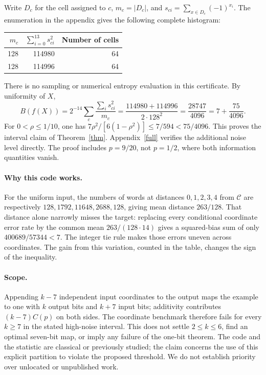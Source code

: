 \documentclass[11pt]{article}
\begin{document}
Write $D_c$ for the cell assigned to $c$, $m_c=|D_c|$, and $s_{ci}=\sum_{x\in D_c}(-1)^{x_i}$. The enumeration in the appendix gives the following complete histogram:
\begin{center}
\begin{tabular}{rrr}
\toprule
$m_c$ & $\sum_{i=0}^{13}s_{ci}^2$ & Number of cells\\
\midrule
128 & 114980 & 64\\
128 & 114996 & 64\\
\bottomrule
\end{tabular}
\end{center}
There is no sampling or numerical entropy evaluation in this certificate. By uniformity of $X$,
\[
 B(f(X))=2^{-14}\sum_c\frac{\sum_i s_{ci}^2}{m_c}
 =\frac{114980+114996}{2\cdot128^2}
 =\frac{28747}{4096}=7+\frac{75}{4096}.
\]
For $0<\rho\le 1/10$, one has $7\rho^2/[6(1-\rho^2)]\le 7/594<75/4096$. This proves the interval claim of Theorem~\ref{thm}. Appendix~\ref{full} verifies the additional noise level directly. The proof includes $p=9/20$, not $p=1/2$, where both information quantities vanish.

\paragraph{Why this code works.}
For the uniform input, the numbers of words at distances $0,1,2,3,4$ from $\mathcal C$ are respectively $128,1792,11648,2688,128$, giving mean distance $263/128$. That distance alone narrowly misses the target: replacing every conditional coordinate error rate by the common mean $263/(128\cdot14)$ gives a squared-bias sum of only $400689/57344<7$. The integer tie rule makes those errors uneven across coordinates. The gain from this variation, counted in the table, changes the sign of the inequality.

\paragraph{Scope.}
Appending $k-7$ independent input coordinates to the output maps the example to one with $k$ output bits and $k+7$ input bits; additivity contributes $(k-7)C(p)$ on both sides. The coordinate benchmark therefore fails for every $k\ge7$ in the stated high-noise interval. This does not settle $2\le k\le6$, find an optimal seven-bit map, or imply any failure of the one-bit theorem. The code and the statistic are classical or previously studied; the claim concerns the use of this explicit partition to violate the proposed threshold. We do not establish priority over unlocated or unpublished work.
\end{document}
